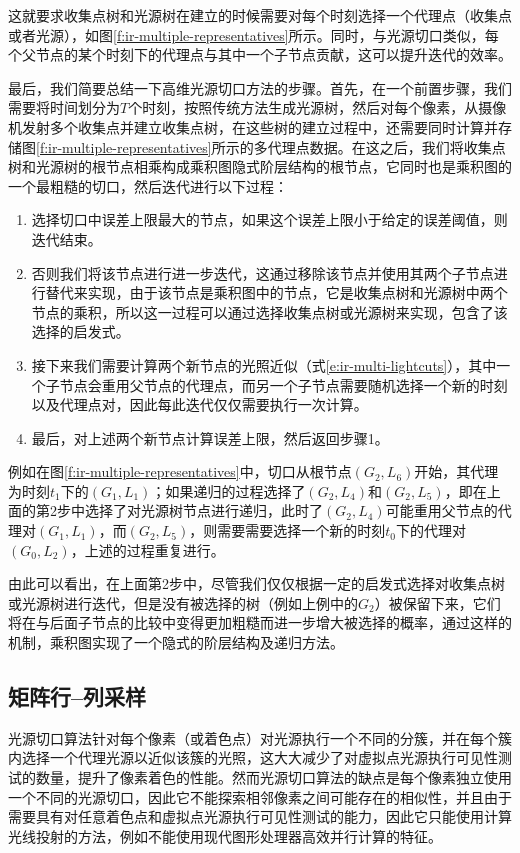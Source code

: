 这就要求收集点树和光源树在建立的时候需要对每个时刻选择一个代理点（收集点或者光源），如图\ref{f:ir-multiple-representatives}所示。同时，与光源切口类似，每个父节点的某个时刻下的代理点与其中一个子节点贡献，这可以提升迭代的效率。

最后，我们简要总结一下高维光源切口方法的步骤。首先，在一个前置步骤，我们需要将时间划分为$T$个时刻，按照传统方法生成光源树，然后对每个像素，从摄像机发射多个收集点并建立收集点树，在这些树的建立过程中，还需要同时计算并存储图\ref{f:ir-multiple-representatives}所示的多代理点数据。在这之后，我们将收集点树和光源树的根节点相乘构成乘积图隐式阶层结构的根节点，它同时也是乘积图的一个最粗糙的切口，然后迭代进行以下过程：

\begin{enumerate}
	\item 选择切口中误差上限最大的节点，如果这个误差上限小于给定的误差阈值，则迭代结束。
	\item 否则我们将该节点进行进一步迭代，这通过移除该节点并使用其两个子节点进行替代来实现，由于该节点是乘积图中的节点，它是收集点树和光源树中两个节点的乘积，所以这一过程可以通过选择收集点树或光源树来实现，\cite{a:MultidimensionalLightcuts}包含了该选择的启发式。
	\item 接下来我们需要计算两个新节点的光照近似（式\ref{e:ir-multi-lightcuts}），其中一个子节点会重用父节点的代理点，而另一个子节点需要随机选择一个新的时刻以及代理点对，因此每此迭代仅仅需要执行一次计算。
	\item 最后，对上述两个新节点计算误差上限，然后返回步骤1。
\end{enumerate}

例如在图\ref{f:ir-multiple-representatives}中，切口从根节点$(G_2,L_6)$开始，其代理为时刻$t_1$下的$(G_1,L_1)$；如果递归的过程选择了$(G_2,L_4)$和$(G_2,L_5)$，即在上面的第2步中选择了对光源树节点进行递归，此时了$(G_2,L_4)$可能重用父节点的代理对$(G_1,L_1)$，而$(G_2,L_5)$，则需要需要选择一个新的时刻$t_0$下的代理对$(G_0,L_2)$，上述的过程重复进行。

由此可以看出，在上面第2步中，尽管我们仅仅根据一定的启发式选择对收集点树或光源树进行迭代，但是没有被选择的树（例如上例中的$G_2$）被保留下来，它们将在与后面子节点的比较中变得更加粗糙而进一步增大被选择的概率，通过这样的机制，乘积图实现了一个隐式的阶层结构及递归方法。




\subsection{矩阵行--列采样}
光源切口算法针对每个像素（或着色点）对光源执行一个不同的分簇，并在每个簇内选择一个代理光源以近似该簇的光照，这大大减少了对虚拟点光源执行可见性测试的数量，提升了像素着色的性能。然而光源切口算法的缺点是每个像素独立使用一个不同的光源切口，因此它不能探索相邻像素之间可能存在的相似性，并且由于需要具有对任意着色点和虚拟点光源执行可见性测试的能力，因此它只能使用计算光线投射的方法，例如不能使用现代图形处理器高效并行计算的特征。

